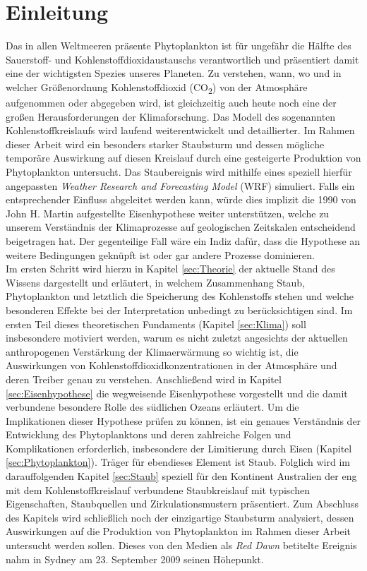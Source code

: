 \documentclass[12pt,a4paper,onecolumn]{scrartcl}
\newcommand{\cotwo}{CO\textsubscript{2}}
\begin{document}
\section{Einleitung} \label{sec:einleitung}
Das in allen Weltmeeren präsente Phytoplankton ist für ungefähr die Hälfte des Sauerstoff- und Kohlenstoffdioxidaustauschs verantwortlich \citep{Emerson.2009} und präsentiert damit eine der wichtigsten Spezies unseres Planeten. Zu verstehen, wann, wo und in welcher Größenordnung Kohlenstoffdioxid (\cotwo) von der Atmosphäre aufgenommen oder abgegeben wird, ist gleichzeitig auch heute noch eine der großen Herausforderungen der Klimaforschung. Das Modell des sogenannten Kohlenstoffkreislaufs wird laufend weiterentwickelt und detaillierter. Im Rahmen dieser Arbeit wird ein besonders starker Staubsturm und dessen mögliche temporäre Auswirkung auf diesen Kreislauf durch eine gesteigerte Produktion von Phytoplankton untersucht. Das Staubereignis wird mithilfe eines speziell hierfür angepassten \textit{Weather Research and Forecasting Model} (WRF) simuliert. Falls ein entsprechender Einfluss abgeleitet werden kann, würde dies implizit die 1990 von John H. Martin aufgestellte Eisenhypothese weiter unterstützen, welche zu unserem Verständnis der Klimaprozesse auf geologischen Zeitskalen entscheidend beigetragen hat. Der gegenteilige Fall wäre ein Indiz dafür, dass die Hypothese an weitere Bedingungen geknüpft ist oder gar andere Prozesse dominieren.  \\

Im ersten Schritt wird hierzu in Kapitel \ref{sec:Theorie} der aktuelle Stand des Wissens dargestellt und erläutert, in welchem Zusammenhang Staub, Phytoplankton und letztlich die Speicherung des Kohlenstoffs stehen und welche besonderen Effekte bei der Interpretation unbedingt zu berücksichtigen sind.  Im ersten Teil dieses theoretischen Fundaments (Kapitel  \ref{sec:Klima}) soll insbesondere motiviert werden, warum es nicht zuletzt angesichts der aktuellen anthropogenen Verstärkung der Klimaerwärmung so wichtig ist, die Auswirkungen von Kohlenstoffdioxidkonzentrationen in der Atmosphäre und deren Treiber genau zu verstehen. Anschließend wird in Kapitel \ref{sec:Eisenhypothese} die wegweisende Eisenhypothese \citep{Martin.1990} vorgestellt und die damit verbundene besondere Rolle des südlichen Ozeans erläutert. Um die Implikationen dieser Hypothese prüfen zu können, ist ein genaues Verständnis der Entwicklung des Phytoplanktons und deren zahlreiche Folgen und Komplikationen erforderlich, insbesondere der Limitierung durch Eisen  (Kapitel \ref{sec:Phytoplankton}). Träger für ebendieses Element ist Staub. Folglich wird im darauffolgenden Kapitel \ref{sec:Staub} speziell für den Kontinent Australien der eng mit dem Kohlenstoffkreislauf verbundene Staubkreislauf mit typischen Eigenschaften, Staubquellen und Zirkulationsmustern  präsentiert. Zum Abschluss des Kapitels wird schließlich noch der einzigartige Staubsturm analysiert, dessen Auswirkungen auf die Produktion von Phytoplankton im Rahmen dieser Arbeit untersucht werden sollen. Dieses von den Medien als \textit{Red Dawn} betitelte Ereignis nahm in Sydney am 23. September 2009 seinen Höhepunkt. \\
\end{document}
